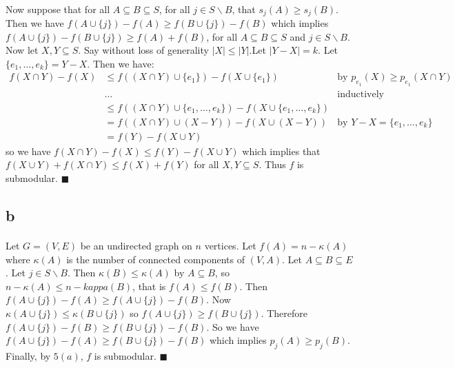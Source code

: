 \documentclass[letterpaper,12pt,oneside,onecolumn]{report}
\begin{document}
\paragraph{}
Now suppose that for all $A \subseteq B \subseteq S$, for all $j \in S \backslash B$, that $s_j(A) \geq s_j(B)$. Then we have $f(A \cup \{j\}) - f(A) \geq f(B \cup \{j\}) - f(B)$ which implies $f(A \cup \{j\}) - f(B \cup \{j\}) \geq f(A) + f(B)$, for all $A \subseteq B \subseteq S$ and $j \in S \backslash B$. Now let $X, Y \subseteq S$. Say without loss of generality $|X| \leq |Y|$.Let $|Y - X| = k$. Let $\{e_1, \dots, e_k\} = Y-X$. Then we have:
\begin{align*}
f(X \cap Y) - f(X) &\leq f((X \cap Y) \cup \{e_1\}) - f(X \cup \{e_1\}) &\text{by $p_{e_1}(X) \geq p_{e_1}(X\cap Y)$} \\
& \dots &\text{inductively} \\
&\leq f((X\cap Y) \cup \{e_1, \dots, e_k\}) - f(X \cup \{e_1, \dots, e_k\}) \\
&= f((X \cap Y) \cup (X - Y)) - f(X \cup (X - Y))  &\text{by $Y-X = \{e_1, \dots, e_k\}$}\\
&= f(Y) - f(X \cup Y)
\end{align*}  
so we have $f(X \cap Y) - f(X) \leq f(Y) - f(X \cup Y)$ which implies that $f(X \cup Y) + f(X \cap Y) \leq f(X) + f(Y)$ for all $X,Y \subseteq S$. Thus $f$ is submodular. $\blacksquare$
\subsection*{b}
\paragraph{}
Let $G = (V,E)$ be an undirected graph on $n$ vertices. Let $f(A) = n - \kappa(A)$ where $\kappa(A)$ is the number of connected components of $(V,A)$. Let $A \subseteq B \subseteq E$. Let $j \in S \backslash B$. Then $\kappa(B) \leq \kappa(A)$ by $A \subseteq B$, so $n - \kappa(A) \leq n - kappa(B)$, that is $f(A) \leq f(B)$. Then $f(A \cup \{j\}) - f(A) \geq f(A \cup \{j\}) - f(B)$. Now $\kappa(A \cup \{j\}) \leq \kappa(B \cup \{j\})$ so $f(A\cup \{j\}) \geq f(B \cup \{j\})$. Therefore $f(A \cup \{j\}) - f(B) \geq f(B \cup \{j\}) - f(B)$. So we have $f(A \cup \{j\}) - f(A) \geq f(B \cup \{j\}) - f(B)$ which implies $p_j(A) \geq p_j(B)$. Finally, by $5(a)$, $f$ is submodular. $\blacksquare$ 
\end{document}
